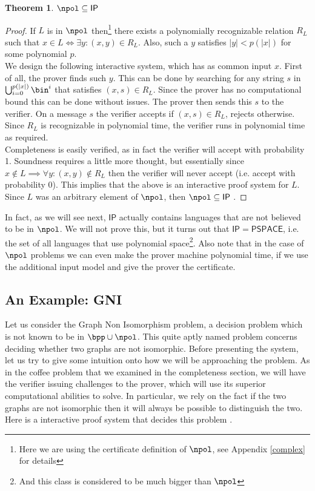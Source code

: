 \documentclass{article}
\newtheorem{theorem}{Theorem}
\begin{document}
\begin{theorem}
    $\npol \subseteq \mathsf{IP}$
\end{theorem}
\begin{proof}
    If $L$ is in $\npol$ then\footnote{Here we are using the certificate definition of $\npol$, see Appendix \ref{complex} for details} there exists a polynomially recognizable relation $R_L$ such that $x \in L \iff \exists y : (x, y) \in R_L$. Also, such a $y$ satisfies $|y| < p(|x|)$ for some polynomial $p$. \\
    We design the following interactive system, which has as common input $x$.
    First of all, the prover finds such $y$. This can be done by searching for any string $s$ in $ \bigcup_{i = 0}^{p(|x|)} \bin^i$ that satisfies $(x, s) \in R_L$. Since the prover has no computational bound this can be done without issues. The prover then sends this $s$ to the verifier. On a message $s$ the verifier accepts if $(x, s) \in R_L$, rejects otherwise. Since $R_L$ is recognizable in polynomial time, the verifier runs in polynomial time as required.  \\
    Completeness is easily verified, as in fact the verifier will accept with probability 1. Soundness requires a little more thought, but essentially since $x \notin L \implies \forall y : (x, y) \notin R_L $ then the verifier will never accept (i.e. accept with probability 0). This implies that the above is an interactive proof system for $L$. Since $L$ was an arbitrary element of $\npol$, then $\npol \subseteq \mathsf{IP}$ .
\end{proof}
In fact, as we will see next, $\mathsf{IP}$ actually contains languages that are not believed to be in $\npol$. We will not prove this, but it turns out that $\mathsf{IP} = \mathsf{PSPACE}$\cite{shamirIPPSPACE1992}, i.e. the set of all languages that use polynomial space\footnote{And this class is considered to be much bigger than $\npol$}. Also note that in the case of $\npol$ problems we can even make the prover machine polynomial time, if we use the additional input model and give the prover the certificate.
\subsection{An Example: GNI}
Let us consider the Graph Non Isomorphism problem, a decision problem which is not known to be in $\bpp \cup \npol$. This quite aptly named problem concerns deciding whether two graphs are not isomorphic.
Before presenting the system, let us try to give some intuition onto how we will be approaching the problem. As in the coffee problem that we examined in the completeness section, we will have the verifier issuing challenges to the prover, which will use its superior computational abilities to solve. In particular, we rely on the fact if the two graphs are not isomorphic then it will always be possible to distinguish the two.
Here is a interactive proof system that decides this problem \cite{goldreichProofsThatYield1991}.
\end{document}
